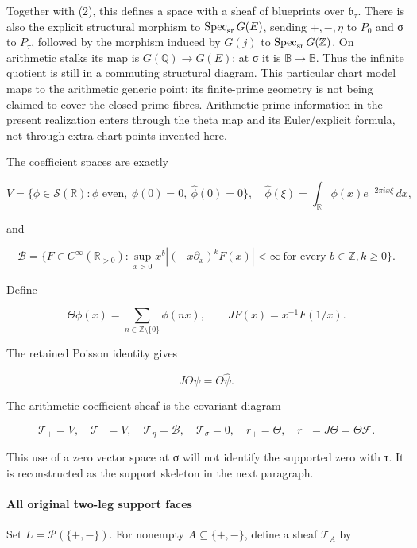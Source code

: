 Together with (2), this defines a space with a sheaf of blueprints over \(\mathfrak b_\tau\). There is also the explicit structural morphism to \(\operatorname{Spec}_{\rm sr}G(E)\), sending \(+, -,\eta\) to \(P_0\) and σ to \(P_\tau\), followed by the morphism induced by \(G(j)\) to \(\operatorname{Spec}_{\rm sr}G(\mathbb Z)\). On arithmetic stalks its map is \(G(\mathbb Q)\to G(E)\); at σ it is \(\mathbb B\to\mathbb B\). Thus the infinite quotient is still in a commuting structural diagram. This particular chart model maps to the arithmetic generic point; its finite-prime geometry is not being claimed to cover the closed prime fibres. Arithmetic prime information in the present realization enters through the theta map and its Euler/explicit formula, not through extra chart points invented here.

The coefficient spaces are exactly

\[
V=\{\phi\in\mathcal S(\mathbb R):\phi\text{ even},\ \phi(0)=0,\ \widehat\phi(0)=0\},
\quad
\widehat\phi(\xi)=\int_{\mathbb R}\phi(x)e^{-2\pi i x\xi}\,dx,
\tag{10}
\]

and

\[
\mathscr B=\{F\in C^\infty(\mathbb R_{>0}):
\sup_{x>0}x^b|(-x\partial_x)^kF(x)|<\infty
\ \text{for every }b\in\mathbb Z,k\ge0\}.
\tag{11}
\]

Define

\[
\Theta\phi(x)=\sum_{n\in\mathbb Z\setminus\{0\}}\phi(nx),
\qquad JF(x)=x^{-1}F(1/x).
\tag{12}
\]

The retained Poisson identity gives

\[
J\Theta\psi=\Theta\widehat\psi.
\tag{13}
\]

The arithmetic coefficient sheaf is the covariant diagram

\[
\mathcal T_+=V,\quad\mathcal T_-=V,\quad
\mathcal T_\eta=\mathscr B,\quad\mathcal T_\sigma=0,
\quad r_+=\Theta,\quad r_-=J\Theta=\Theta\mathcal F.
\tag{14}
\]

This use of a zero vector space at σ will not identify the supported zero with τ. It is reconstructed as the support skeleton in the next paragraph.

\paragraph{All original two-leg support faces}\label{endpoint-tau_base--all-original-two-leg-support-faces}

Set \(L=\mathcal P(\{+,-\})\). For nonempty \(A\subseteq\{+,-\}\), define a sheaf \(\mathcal T_A\) by

